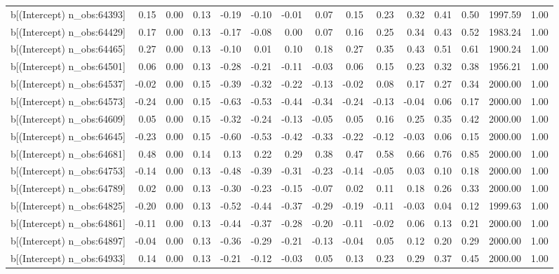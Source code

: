 \begin{table}[ht]
\begin{tabular}{rrrrrrrrrrrrrrr}
  b[(Intercept) n\_obs:64393] & 0.15 & 0.00 & 0.13 & -0.19 & -0.10 & -0.01 & 0.07 & 0.15 & 0.23 & 0.32 & 0.41 & 0.50 & 1997.59 & 1.00 \\ 
  b[(Intercept) n\_obs:64429] & 0.17 & 0.00 & 0.13 & -0.17 & -0.08 & 0.00 & 0.07 & 0.16 & 0.25 & 0.34 & 0.43 & 0.52 & 1983.24 & 1.00 \\ 
  b[(Intercept) n\_obs:64465] & 0.27 & 0.00 & 0.13 & -0.10 & 0.01 & 0.10 & 0.18 & 0.27 & 0.35 & 0.43 & 0.51 & 0.61 & 1900.24 & 1.00 \\ 
  b[(Intercept) n\_obs:64501] & 0.06 & 0.00 & 0.13 & -0.28 & -0.21 & -0.11 & -0.03 & 0.06 & 0.15 & 0.23 & 0.32 & 0.38 & 1956.21 & 1.00 \\ 
  b[(Intercept) n\_obs:64537] & -0.02 & 0.00 & 0.15 & -0.39 & -0.32 & -0.22 & -0.13 & -0.02 & 0.08 & 0.17 & 0.27 & 0.34 & 2000.00 & 1.00 \\ 
  b[(Intercept) n\_obs:64573] & -0.24 & 0.00 & 0.15 & -0.63 & -0.53 & -0.44 & -0.34 & -0.24 & -0.13 & -0.04 & 0.06 & 0.17 & 2000.00 & 1.00 \\ 
  b[(Intercept) n\_obs:64609] & 0.05 & 0.00 & 0.15 & -0.32 & -0.24 & -0.13 & -0.05 & 0.05 & 0.16 & 0.25 & 0.35 & 0.42 & 2000.00 & 1.00 \\ 
  b[(Intercept) n\_obs:64645] & -0.23 & 0.00 & 0.15 & -0.60 & -0.53 & -0.42 & -0.33 & -0.22 & -0.12 & -0.03 & 0.06 & 0.15 & 2000.00 & 1.00 \\ 
  b[(Intercept) n\_obs:64681] & 0.48 & 0.00 & 0.14 & 0.13 & 0.22 & 0.29 & 0.38 & 0.47 & 0.58 & 0.66 & 0.76 & 0.85 & 2000.00 & 1.00 \\ 
  b[(Intercept) n\_obs:64753] & -0.14 & 0.00 & 0.13 & -0.48 & -0.39 & -0.31 & -0.23 & -0.14 & -0.05 & 0.03 & 0.10 & 0.18 & 2000.00 & 1.00 \\ 
  b[(Intercept) n\_obs:64789] & 0.02 & 0.00 & 0.13 & -0.30 & -0.23 & -0.15 & -0.07 & 0.02 & 0.11 & 0.18 & 0.26 & 0.33 & 2000.00 & 1.00 \\ 
  b[(Intercept) n\_obs:64825] & -0.20 & 0.00 & 0.13 & -0.52 & -0.44 & -0.37 & -0.29 & -0.19 & -0.11 & -0.03 & 0.04 & 0.12 & 1999.63 & 1.00 \\ 
  b[(Intercept) n\_obs:64861] & -0.11 & 0.00 & 0.13 & -0.44 & -0.37 & -0.28 & -0.20 & -0.11 & -0.02 & 0.06 & 0.13 & 0.21 & 2000.00 & 1.00 \\ 
  b[(Intercept) n\_obs:64897] & -0.04 & 0.00 & 0.13 & -0.36 & -0.29 & -0.21 & -0.13 & -0.04 & 0.05 & 0.12 & 0.20 & 0.29 & 2000.00 & 1.00 \\ 
  b[(Intercept) n\_obs:64933] & 0.14 & 0.00 & 0.13 & -0.21 & -0.12 & -0.03 & 0.05 & 0.13 & 0.23 & 0.29 & 0.37 & 0.45 & 2000.00 & 1.00 \\ 

\end{tabular}
\end{table}
